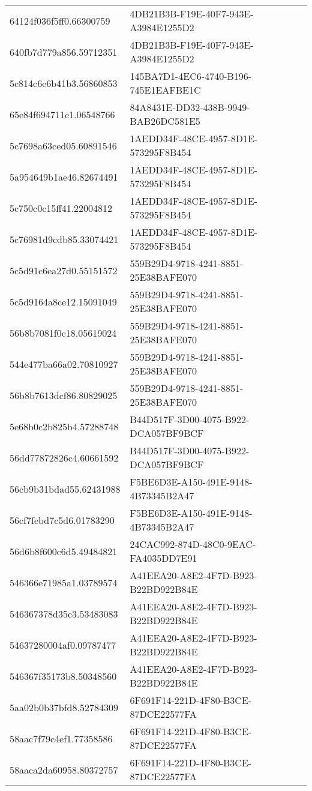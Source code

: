 \begin{tabular}{ll}
64124f036f5ff0.66300759 & 4DB21B3B-F19E-40F7-943E-A3984E1255D2 \\
640fb7d779a856.59712351 & 4DB21B3B-F19E-40F7-943E-A3984E1255D2 \\
5c814c6e6b41b3.56860853 & 145BA7D1-4EC6-4740-B196-745E1EAFBE1C \\
65e84f694711e1.06548766 & 84A8431E-DD32-438B-9949-BAB26DC581E5 \\
5c7698a63ced05.60891546 & 1AEDD34F-48CE-4957-8D1E-573295F8B454 \\
5a954649b1ae46.82674491 & 1AEDD34F-48CE-4957-8D1E-573295F8B454 \\
5c750c0c15ff41.22004812 & 1AEDD34F-48CE-4957-8D1E-573295F8B454 \\
5c76981d9cdb85.33074421 & 1AEDD34F-48CE-4957-8D1E-573295F8B454 \\
5c5d91c6ea27d0.55151572 & 559B29D4-9718-4241-8851-25E38BAFE070 \\
5c5d9164a8ce12.15091049 & 559B29D4-9718-4241-8851-25E38BAFE070 \\
56b8b7081f0c18.05619024 & 559B29D4-9718-4241-8851-25E38BAFE070 \\
544e477ba66a02.70810927 & 559B29D4-9718-4241-8851-25E38BAFE070 \\
56b8b7613dcf86.80829025 & 559B29D4-9718-4241-8851-25E38BAFE070 \\
5e68b0c2b825b4.57288748 & B44D517F-3D00-4075-B922-DCA057BF9BCF \\
56dd77872826c4.60661592 & B44D517F-3D00-4075-B922-DCA057BF9BCF \\
56cb9b31bdad55.62431988 & F5BE6D3E-A150-491E-9148-4B73345B2A47 \\
56cf7febd7c5d6.01783290 & F5BE6D3E-A150-491E-9148-4B73345B2A47 \\
56d6b8f600c6d5.49484821 & 24CAC992-874D-48C0-9EAC-FA4035DD7E91 \\
546366e71985a1.03789574 & A41EEA20-A8E2-4F7D-B923-B22BD922B84E \\
546367378d35c3.53483083 & A41EEA20-A8E2-4F7D-B923-B22BD922B84E \\
54637280004af0.09787477 & A41EEA20-A8E2-4F7D-B923-B22BD922B84E \\
546367f35173b8.50348560 & A41EEA20-A8E2-4F7D-B923-B22BD922B84E \\
5aa02b0b37bfd8.52784309 & 6F691F14-221D-4F80-B3CE-87DCE22577FA \\
58aac7f79c4ef1.77358586 & 6F691F14-221D-4F80-B3CE-87DCE22577FA \\
58aaca2da60958.80372757 & 6F691F14-221D-4F80-B3CE-87DCE22577FA \\

\end{tabular}
